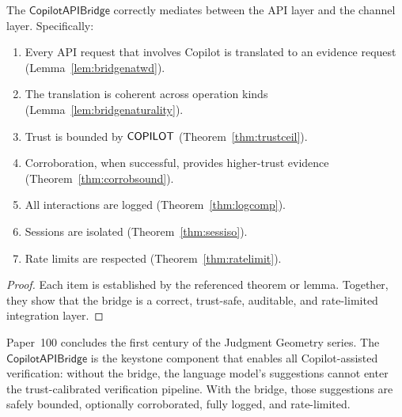 \documentclass[11pt]{article}
\newcommand{\Bridge}{\mathsf{CopilotAPIBridge}}
\begin{document}
\begin{proposition}%
\label{prop:bridgecorrect}
The $\Bridge$ correctly mediates between the API layer and
the channel layer.  Specifically:
\begin{enumerate}
\item Every API request that involves Copilot is translated
      to an evidence request (Lemma~\ref{lem:bridgenatwd}).
\item The translation is coherent across operation kinds
      (Lemma~\ref{lem:bridgenaturality}).
\item Trust is bounded by $\mathsf{COPILOT}$
      (Theorem~\ref{thm:trustceil}).
\item Corroboration, when successful, provides higher-trust
      evidence (Theorem~\ref{thm:corrobsound}).
\item All interactions are logged
      (Theorem~\ref{thm:logcomp}).
\item Sessions are isolated
      (Theorem~\ref{thm:sessiso}).
\item Rate limits are respected
      (Theorem~\ref{thm:ratelimit}).
\end{enumerate}
\end{proposition}
\begin{proof}
Each item is established by the referenced theorem or lemma.
Together, they show that the bridge is a correct, trust-safe,
auditable, and rate-limited integration layer.
\end{proof}

\begin{remark}
Paper~100 concludes the first century of the Judgment Geometry
series.  The $\Bridge$ is the keystone component that enables
all Copilot-assisted verification: without the bridge, the
language model's suggestions cannot enter the trust-calibrated
verification pipeline.  With the bridge, those suggestions are
safely bounded, optionally corroborated, fully logged, and
rate-limited.
\end{remark}
\end{document}
